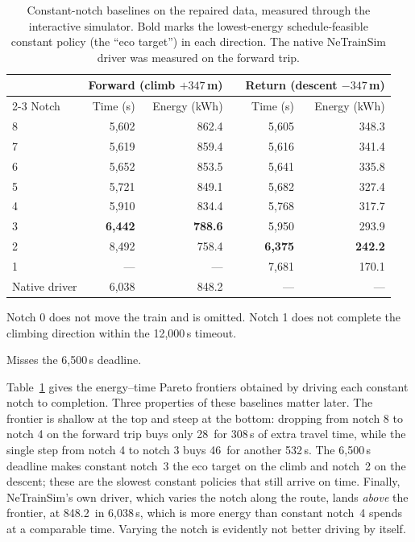 \documentclass[11pt,a4paper]{article}
\newcommand{\kwh}{\,\text{kWh}}   %
\begin{document}
\begin{table}[t]
\centering\small
\begin{threeparttable}
\caption{Constant-notch baselines on the repaired data, measured through
the interactive simulator. Bold marks the lowest-energy schedule-feasible
constant policy (the ``eco target'') in each direction. The native
NeTrainSim driver was measured on the forward trip.}
\label{tab:frontier}
\begin{tabular}{l rr c rr}
\toprule
& \multicolumn{2}{c}{Forward (climb $+347$\,m)} & \hspace{4mm} & \multicolumn{2}{c}{Return (descent $-347$\,m)} \\
\cmidrule{2-3}\cmidrule{5-6}
Notch\tnote{a} & Time (s) & Energy (kWh) & & Time (s) & Energy (kWh) \\
\midrule
8 & 5{,}602 & 862.4 & & 5{,}605 & 348.3 \\
7 & 5{,}619 & 859.4 & & 5{,}616 & 341.4 \\
6 & 5{,}652 & 853.5 & & 5{,}641 & 335.8 \\
5 & 5{,}721 & 849.1 & & 5{,}682 & 327.4 \\
4 & 5{,}910 & 834.4 & & 5{,}768 & 317.7 \\
3 & \textbf{6{,}442} & \textbf{788.6} & & 5{,}950 & 293.9 \\
2 & 8{,}492\tnote{b} & 758.4 & & \textbf{6{,}375} & \textbf{242.2} \\
1 & --- & --- & & 7{,}681\tnote{b} & 170.1 \\
\midrule
Native driver & 6{,}038 & 848.2 & & --- & --- \\
\bottomrule
\end{tabular}
\begin{tablenotes}\footnotesize
\item[a] Notch 0 does not move the train and is omitted. Notch 1 does not
complete the climbing direction within the 12{,}000\,s timeout.
\item[b] Misses the 6{,}500\,s deadline.
\end{tablenotes}
\end{threeparttable}
\end{table}

Table~\ref{tab:frontier} gives the energy--time Pareto frontiers obtained
by driving each constant notch to completion. Three properties of these
baselines matter later. The frontier is shallow at the top and steep at
the bottom: dropping from notch 8 to notch 4 on the forward trip buys
only 28\kwh{} for 308\,s of extra travel time, while the single step from
notch 4 to notch 3 buys 46\kwh{} for another 532\,s. The 6{,}500\,s
deadline makes constant notch~3 the eco target on the climb and notch~2
on the descent; these are the slowest constant policies that still arrive
on time. Finally, NeTrainSim's own driver, which varies the notch along
the route, lands \emph{above} the frontier, at 848.2\kwh{} in 6{,}038\,s,
which is more energy than constant notch~4 spends at a comparable time.
Varying the notch is evidently not better driving by itself.
\end{document}
